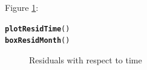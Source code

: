 \documentclass[a4paper,11pt]{article}\usepackage{graphicx, color}
\makeatletter
\newcommand{\hlfunctioncall}[1]{\textcolor[rgb]{0.501960784313725,0,0.329411764705882}{\textbf{#1}}}%
\newenvironment{kframe}{%
 \def\at@end@of@kframe{}%
 \ifinner\ifhmode%
  \def\at@end@of@kframe{\end{minipage}}%
  \begin{minipage}{\columnwidth}%
 \fi\fi%
 \def\FrameCommand##1{\hskip\@totalleftmargin \hskip-\fboxsep
 \colorbox{shadecolor}{##1}\hskip-\fboxsep
     \hskip-\linewidth \hskip-\@totalleftmargin \hskip\columnwidth}%
 \MakeFramed {\advance\hsize-\width
   \@totalleftmargin\z@ \linewidth\hsize
   \@setminipage}}%
 {\par\unskip\endMakeFramed%
 \at@end@of@kframe}
\newenvironment{knitrout}{}{} %
\makeatother
\begin{document}
Figure \ref{fig:boxResidMonth}:
\begin{knitrout}
\color{fgcolor}\begin{kframe}
\begin{alltt}
\hlfunctioncall{plotResidTime}()
\hlfunctioncall{boxResidMonth}()
\end{alltt}
\end{kframe}\begin{figure}[]
\caption[Residuals with respect to time]{Residuals with respect to time\label{fig:boxResidMonth}}
\end{figure}


\end{knitrout}
\end{document}
